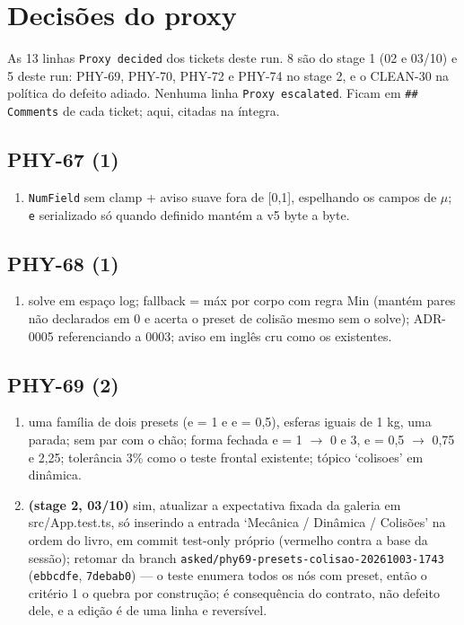 \documentclass[11pt,a4paper]{article}
\begin{document}
\section{Decisões do proxy}

As 13 linhas \texttt{Proxy decided} dos tickets deste run. 8 são do stage 1
(02 e 03/10) e 5 deste run: PHY-69, PHY-70, PHY-72 e PHY-74 no stage 2, e o
CLEAN-30 na política do defeito adiado. Nenhuma linha \texttt{Proxy escalated}.
Ficam em \texttt{\#\# Comments} de cada ticket; aqui, citadas na íntegra.

{\small\sloppy
\subsection*{PHY-67 (1)}
\begin{enumerate}
  \item \texttt{NumField} sem clamp + aviso suave fora de [0,1], espelhando os campos de $\mu$; \texttt{e} serializado só quando definido mantém a v5 byte a byte.
\end{enumerate}
\subsection*{PHY-68 (1)}
\begin{enumerate}
  \item solve em espaço log; fallback = máx por corpo com regra Min (mantém pares não declarados em 0 e acerta o preset de colisão mesmo sem o solve); ADR-0005 referenciando a 0003; aviso em inglês cru como os existentes.
\end{enumerate}
\subsection*{PHY-69 (2)}
\begin{enumerate}
  \item uma família de dois presets (e = 1 e e = 0,5), esferas iguais de 1 kg, uma parada; sem par com o chão; forma fechada e = 1 $\to$ 0 e 3, e = 0,5 $\to$ 0,75 e 2,25; tolerância 3\% como o teste frontal existente; tópico `colisoes' em dinâmica.
  \item \textbf{(stage 2, 03/10)} sim, atualizar a expectativa fixada da galeria em src/App.test.ts, só inserindo a entrada `Mecânica / Dinâmica / Colisões' na ordem do livro, em commit test-only próprio (vermelho contra a base da sessão); retomar da branch \texttt{asked/phy69-presets-colisao-20261003-1743} (\texttt{ebbcdfe}, \texttt{7debab0}) --- o teste enumera todos os nós com preset, então o critério 1 o quebra por construção; é consequência do contrato, não defeito dele, e a edição é de uma linha e reversível.
\end{enumerate}
}
\end{document}

